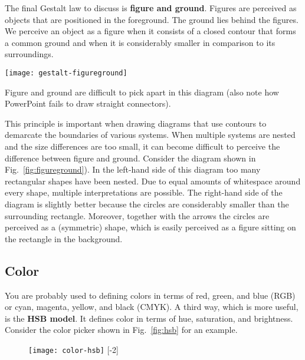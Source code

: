 The final Gestalt law to discuss is \textbf{figure and ground}. Figures are perceived as objects that are positioned in the foreground. The ground lies behind the figures. We perceive an object as a figure when it consists of a closed contour that forms a common ground and when it is considerably smaller in comparison to its surroundings.

\begin{marginfigure}
\centering
\texttt{[image: gestalt-figureground]}
\caption{\label{fig:figureground} Figure and ground are difficult to pick apart in this diagram (also note how PowerPoint fails to draw straight connectors).}%
\end{marginfigure}

This principle is important when drawing diagrams that use contours to demarcate the boundaries of various systems. When multiple systems are nested and the size differences are too small, it can become difficult to perceive the difference between figure and ground. Consider the diagram shown in Fig.~\ref{fig:figureground}). In the left-hand side of this diagram too many rectangular shapes have been nested. Due to equal amounts of whitespace around every shape, multiple interpretations are possible. The right-hand side of the diagram is slightly better because the circles are considerably smaller than the surrounding rectangle. Moreover, together with the arrows the circles are perceived as a (symmetric) shape, which is easily perceived as a figure sitting on the rectangle in the background.




\subsection{Color}
\label{sec:color}

You are probably used to defining colors in terms of red, green, and blue (RGB) or cyan, magenta, yellow, and black (CMYK). A third way, which is more useful, is the \textbf{HSB model}. It defines color in terms of hue, saturation, and brightness. Consider the color picker shown in Fig.~\ref{fig:hsb} for an example.

\begin{figure}
\centering
\texttt{[image: color-hsb]}
[-2\baselineskip]
\end{figure}


